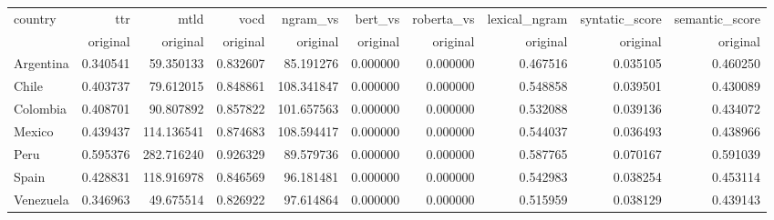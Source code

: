 \begin{tabular}{lrrrrrrrrr}
\toprule
country & ttr & mtld & vocd & ngram_vs & bert_vs & roberta_vs & lexical_ngram & syntatic_score & semantic_score \\
 & original & original & original & original & original & original & original & original & original \\
\midrule
Argentina & 0.340541 & 59.350133 & 0.832607 & 85.191276 & 0.000000 & 0.000000 & 0.467516 & 0.035105 & 0.460250 \\
Chile & 0.403737 & 79.612015 & 0.848861 & 108.341847 & 0.000000 & 0.000000 & 0.548858 & 0.039501 & 0.430089 \\
Colombia & 0.408701 & 90.807892 & 0.857822 & 101.657563 & 0.000000 & 0.000000 & 0.532088 & 0.039136 & 0.434072 \\
Mexico & 0.439437 & 114.136541 & 0.874683 & 108.594417 & 0.000000 & 0.000000 & 0.544037 & 0.036493 & 0.438966 \\
Peru & 0.595376 & 282.716240 & 0.926329 & 89.579736 & 0.000000 & 0.000000 & 0.587765 & 0.070167 & 0.591039 \\
Spain & 0.428831 & 118.916978 & 0.846569 & 96.181481 & 0.000000 & 0.000000 & 0.542983 & 0.038254 & 0.453114 \\
Venezuela & 0.346963 & 49.675514 & 0.826922 & 97.614864 & 0.000000 & 0.000000 & 0.515959 & 0.038129 & 0.439143 \\
\bottomrule
\end{tabular}
